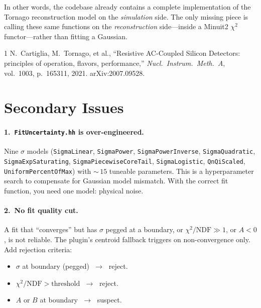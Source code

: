 \documentclass[11pt,a4paper]{article}
\newcommand{\code}[1]{\texttt{#1}}
\newcommand{\file}[1]{\texttt{#1}}
\begin{document}
\medskip\noindent
In other words, the codebase already contains a complete implementation
of the Tornago reconstruction model on the \emph{simulation} side.
The only missing piece is calling these same functions on the
\emph{reconstruction} side---inside a Minuit2 $\chi^{2}$ functor---rather
than fitting a Gaussian.

\begin{thebibliography}{1}
  N.~Cartiglia, M.~Tornago, et al.,
  ``Resistive AC-Coupled Silicon Detectors: principles of operation,
    flavors, performance,''
  \textit{Nucl.\ Instrum.\ Meth.\ A}, vol.~1003, p.~165311, 2021.
  arXiv:2007.09528.
\end{thebibliography}

\section{Secondary Issues}

\paragraph{1.\ \file{FitUncertainty.hh} is over-engineered.}
Nine $\sigma$ models (\code{SigmaLinear}, \code{SigmaPower},
\code{SigmaPowerInverse}, \code{SigmaQuadratic},
\code{SigmaExpSaturating}, \code{SigmaPiecewiseCoreTail},
\code{SigmaLogistic}, \code{QnQiScaled}, \code{UniformPercentOfMax})
with ${\sim}\,15$ tuneable parameters.  This is a hyperparameter search
to compensate for Gaussian model mismatch.  With the correct fit
function, you need one model: physical noise.

\paragraph{2.\ No fit quality cut.}
A fit that ``converges'' but has $\sigma$ pegged at a boundary, or
$\chi^{2}/\text{NDF} \gg 1$, or $A < 0$, is not reliable.  The plugin's
centroid fallback triggers on non-convergence only.  Add rejection
criteria:
\begin{itemize}[nosep]
  \item $\sigma$ at boundary (pegged) $\;\to\;$ reject.
  \item $\chi^{2}/\text{NDF} > \text{threshold}$ $\;\to\;$ reject.
  \item $A$ or $B$ at boundary $\;\to\;$ suspect.
\end{itemize}
\end{document}
